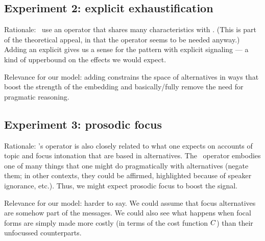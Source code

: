 \documentclass{article}
\begin{document}

\subsection{Experiment 2: explicit exhaustification}\label{sec:exp2}

\begin{examples}
\item Rationale: \CFS\ use an operator that shares many
  characteristics with . (This is part of the theoretical
  appeal, in that the operator seems to be needed anyway.)  Adding an
  explicit  gives us a sense for the pattern with explicit
  signaling --- a kind of upperbound on the effects we would expect.

\item Relevance for our model: adding  constrains the space
  of alternatives in ways that boost the strength of the embedding and
  basically/fully remove the need for pragmatic reasoning.  
\end{examples}


\subsection{Experiment 3: prosodic focus}\label{sec:exp3}

\begin{examples}
\item Rationale: \CFS's operator is also closely related to what one
  expects on accounts of topic and focus intonation that are based in
  alternatives. The \ALT\ operator embodies one of many things that
  one might do pragmatically with alternatives (negate them; in other
  contexts, they could be affirmed, highlighted because of speaker
  ignorance, etc.). Thus, we might expect prosodic focus to boost the
  signal.

\item Relevance for our model: harder to say. We could assume that
  focus alternatives are somehow part of the messages. We could also
  see what happens when focal forms are simply made more costly (in
  terms of the cost function $C$) than their unfocussed
  counterparts.
\end{examples}




\end{document}
